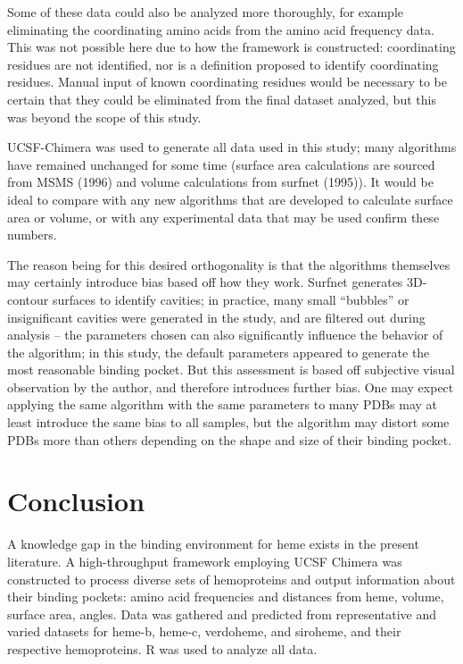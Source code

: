 \documentclass[a4paper, nobind]{templates/ociamthesis}
\begin{document}
Some of these data could also be analyzed more thoroughly, for example eliminating the coordinating amino acids from the amino acid frequency data. This was not possible here due to how the framework is constructed: coordinating residues are not identified, nor is a definition proposed to identify coordinating residues. Manual input of known coordinating residues would be necessary to be certain that they could be eliminated from the final dataset analyzed, but this was beyond the scope of this study.

UCSF-Chimera was used to generate all data used in this study; many algorithms have remained unchanged for some time (surface area calculations are sourced from MSMS (1996) and volume calculations from surfnet (1995)). It would be ideal to compare with any new algorithms that are developed to calculate surface area or volume, or with any experimental data that may be used confirm these numbers.

The reason being for this desired orthogonality is that the algorithms themselves may certainly introduce bias based off how they work. Surfnet generates 3D-contour surfaces to identify cavities; in practice, many small ``bubbles'' or insignificant cavities were generated in the study, and are filtered out during analysis -- the parameters chosen can also significantly influence the behavior of the algorithm; in this study, the default parameters appeared to generate the most reasonable binding pocket. But this assessment is based off subjective visual observation by the author, and therefore introduces further bias. One may expect applying the same algorithm with the same parameters to many PDBs may at least introduce the same bias to all samples, but the algorithm may distort some PDBs more than others depending on the shape and size of their binding pocket.

\adjustmtc
{}

\hypertarget{conclusion}{%
\chapter{Conclusion}\label{conclusion}}

A knowledge gap in the binding environment for heme exists in the present literature. A high-throughput framework employing UCSF Chimera was constructed to process diverse sets of hemoproteins and output information about their binding pockets: amino acid frequencies and distances from heme, volume, surface area, angles. Data was gathered and predicted from representative and varied datasets for heme-b, heme-c, verdoheme, and siroheme, and their respective hemoproteins. R was used to analyze all data.
\end{document}
